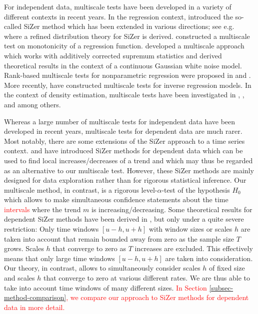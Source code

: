 For independent data, multiscale tests have been developed in a variety of different contexts in recent years. In the regression context, \cite{ChaudhuriMarron1999,ChaudhuriMarron2000} introduced the so-called SiZer method which has been extended in various directions; see e.g.\ \cite{HannigMarron2006} where a refined distribution theory for SiZer is derived. \cite{HallHeckman2000} constructed a multiscale test on monotonicity of a regression function. \cite{DuembgenSpokoiny2001} developed a multiscale approach which works with additively corrected supremum statistics and derived theoretical results in the context of a continuous Gaussian white noise model. Rank-based multiscale tests for nonparametric regression were proposed in \cite{Duembgen2002} and \cite{Rohde2008}. More recently, \cite{ProkschWernerMunk2018} have constructed multiscale tests for inverse regression models. In the context of density estimation, multiscale tests have been investigated in \cite{DuembgenWalther2008}, \cite{RufibachWalther2010}, \cite{SchmidtHieber2013} and \cite{EckleBissantzDette2017} among others. 


Whereas a large number of multiscale tests for independent data have been developed in recent years, multiscale tests for dependent data are much rarer. Most notably, there are some extensions of the SiZer approach to a time series context. \cite{Rondonotti2004} and \cite{Rondonotti2007} have introduced SiZer methods for dependent data which can be used to find local increases/decreases of a trend and which may thus be regarded as an alternative to our multiscale test. However, these SiZer methods are mainly designed for data exploration rather than for rigorous statistical inference. Our multiscale method, in contrast, is a rigorous level-$\alpha$-test of the hypo\-thesis $H_0$ which allows to make simultaneous confidence statements about the time \textcolor{red}{intervals} where the trend $m$ is increasing/decreasing. Some theoretical results for dependent SiZer methods have been derived in \cite{ParkHannigKang2009}, but only under a quite severe restriction: Only time windows $[u-h,u+h]$ with window sizes or scales $h$ are taken into account that remain bounded away from zero as the sample size $T$ grows. Scales $h$ that converge to zero as $T$ increases are excluded. This effectively means that only large time windows $[u-h,u+h]$ are taken into consideration. Our theory, in contrast, allows to simultaneously consider scales $h$ of fixed size and scales $h$ that converge to zero at various different rates. We are thus able to take into account time windows of many different sizes. \textcolor{red}{In Section \ref{subsec-method-comparison}, we compare our approach to SiZer methods for dependent data in more detail.}


